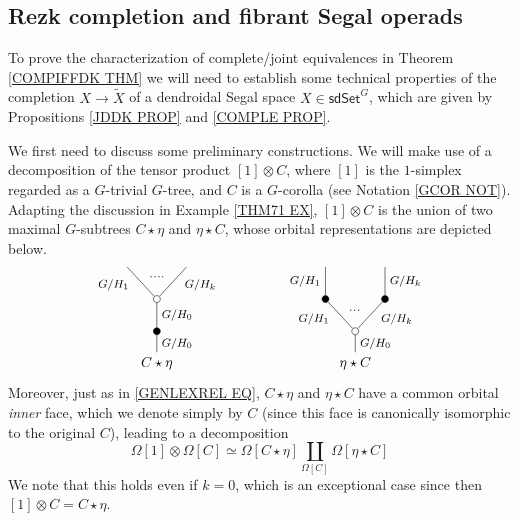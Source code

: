 \documentclass[a4paper,10pt
 ,draft
]{article}%
\begin{document}
\subsection{Rezk completion and fibrant Segal operads}
\label{REZKCOMP SEC}

To prove the characterization of complete/joint equivalences in Theorem \ref{COMPIFFDK THM}
we will need to establish some technical properties of the completion %
$X \to \tilde{X}$
of a dendroidal Segal space $X \in \mathsf{sdSet}^G$,
which are given by Propositions \ref{JDDK PROP} and \ref{COMPLE PROP}.

We first need to discuss some preliminary constructions.
We will make use of a decomposition of the tensor product $[1] \otimes C$,
where $[1]$ is the $1$-simplex regarded as a $G$-trivial $G$-tree, and $C$ is a $G$-corolla 
(see Notation \ref{GCOR NOT}). Adapting the discussion
in Example \ref{THM71 EX}, $[1] \otimes C$ is the union of two maximal $G$-subtrees $C \star \eta$ and $\eta \star C$,
whose orbital representations are depicted below.
\begin{equation}\label{OTIMESDECOMP EQ}
\begin{tikzpicture}
[grow=up,auto,level distance=2.3em,every node/.style = {font=\footnotesize},dummy/.style={circle,draw,inner sep=0pt,minimum size=1.75mm}]
	\node at (0,0) [font=\normalsize] {$C \star \eta$}
		child{node [dummy,fill=black] {}
			child{node [dummy] {}
				child{
				edge from parent node [swap,near end] {$G/H_k$} node [name=Kn] {}}
				child{
				edge from parent node [near end] {$G/H_1$}
node [name=Kone,swap] {}}
			edge from parent node [swap] {$G/H_0$}}
		edge from parent node [swap] {$G/H_0$}};
		\draw [dotted,thick] (Kone) -- (Kn) ;
	\node at (5,0) [font=\normalsize] {$\eta \star C$}
		child{node [dummy] {}
			child{node [dummy,fill=black] {}
				child{
				edge from parent node [swap] {$G/H_k$}}
			edge from parent node [swap,near end] {$G/H_k$} node [name=Kn] {}}
			child{node [dummy,fill=black] {}
				child{
				edge from parent node {$G/H_1$}}
			edge from parent node [near end] {$G/H_1$}
node [name=Kone,swap] {}}
		edge from parent node [swap] {$G/H_0$}
		};
		\draw [dotted,thick] (Kone) -- (Kn) ;
\end{tikzpicture}
\end{equation}
Moreover, just as in \eqref{GENLEXREL EQ}, 
$C \star \eta$ and $\eta \star C$ have a common orbital \emph{inner} face, which we denote simply by $C$
(since this face is canonically isomorphic to the original $C$),
leading to a decomposition
\begin{equation}
      \label{OTIMESOC_EQ}
      \Omega[1] \otimes \Omega[C]
      \simeq
      \Omega[C \star \eta] \coprod_{\Omega[C]} \Omega[\eta \star C]
\end{equation}
We note that this holds even if $k=0$, 
which is an exceptional case since then
$[1] \otimes C = C \star \eta$.
\end{document}
